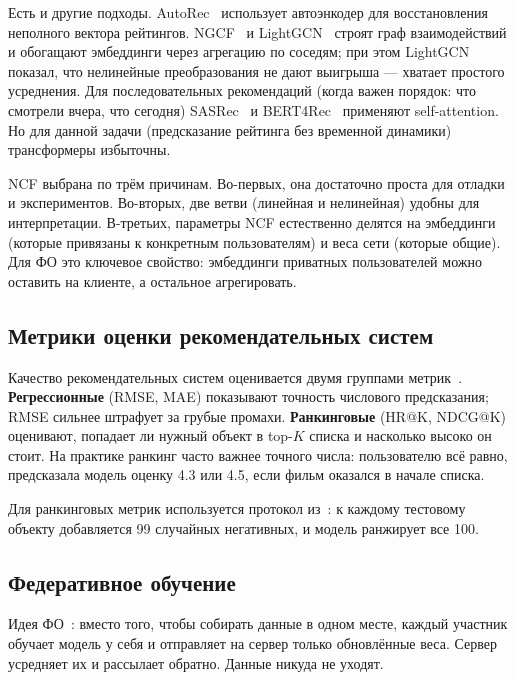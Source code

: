 \documentclass[14pt,a4paper]{extarticle}
\begin{document}
Есть и другие подходы. AutoRec~\cite{sedhain2015autorec} использует автоэнкодер для восстановления неполного вектора рейтингов. NGCF~\cite{wang2019neural} и LightGCN~\cite{he2020lightgcn} строят граф взаимодействий и обогащают эмбеддинги через агрегацию по соседям; при этом LightGCN показал, что нелинейные преобразования не дают выигрыша --- хватает простого усреднения. Для последовательных рекомендаций (когда важен порядок: что смотрели вчера, что сегодня) SASRec~\cite{kang2018selfattentive} и BERT4Rec~\cite{sun2019bert4rec} применяют self-attention. Но для данной задачи (предсказание рейтинга без временной динамики) трансформеры избыточны.

NCF выбрана по трём причинам. Во-первых, она достаточно проста для отладки и экспериментов. Во-вторых, две ветви (линейная и нелинейная) удобны для интерпретации. В-третьих, параметры NCF естественно делятся на эмбеддинги (которые привязаны к конкретным пользователям) и веса сети (которые общие). Для ФО это ключевое свойство: эмбеддинги приватных пользователей можно оставить на клиенте, а остальное агрегировать.


\subsection{Метрики оценки рекомендательных систем}

Качество рекомендательных систем оценивается двумя группами метрик~\cite{ricci2015recommender}. \textbf{Регрессионные} (RMSE, MAE) показывают точность числового предсказания; RMSE сильнее штрафует за грубые промахи. \textbf{Ранкинговые} (HR@K, NDCG@K) оценивают, попадает ли нужный объект в top-$K$ списка и насколько высоко он стоит. На практике ранкинг часто важнее точного числа: пользователю всё равно, предсказала модель оценку 4.3 или 4.5, если фильм оказался в начале списка.

Для ранкинговых метрик используется протокол из~\cite{he2017neural}: к каждому тестовому объекту добавляется 99 случайных негативных, и модель ранжирует все 100.


\subsection{Федеративное обучение}

Идея ФО~\cite{mcmahan2017communication}: вместо того, чтобы собирать данные в одном месте, каждый участник обучает модель у себя и отправляет на сервер только обновлённые веса. Сервер усредняет их и рассылает обратно. Данные никуда не уходят.
\end{document}
